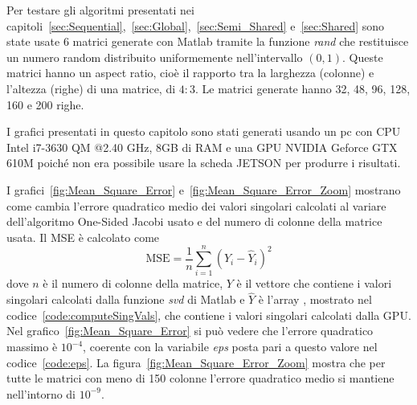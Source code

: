\label{sec:Performance}
Per testare gli algoritmi presentati nei capitoli~\ref{sec:Sequential},~\ref{sec:Global},~\ref{sec:Semi_Shared} e~\ref{sec:Shared} sono state usate 6 matrici generate con Matlab tramite la funzione \textit{rand} che restituisce un numero random distribuito uniformemente nell'intervallo $(0,1)$. Queste matrici hanno un aspect ratio, cioè il rapporto tra la larghezza (colonne) e l'altezza (righe) di una matrice, di $4:3$. Le matrici generate hanno 32, 48, 96, 128, 160 e 200 righe. 

I grafici presentati in questo capitolo sono stati generati usando un pc con CPU Intel i7-3630 QM @2.40 GHz, 8GB di RAM e una GPU NVIDIA Geforce GTX 610M poiché non era possibile usare la scheda JETSON per produrre i risultati.

I grafici~\ref{fig:Mean_Square_Error} e~\ref{fig:Mean_Square_Error_Zoom} mostrano come cambia l'errore quadratico medio dei valori singolari calcolati al variare dell'algoritmo One-Sided Jacobi usato e del numero di colonne della matrice usata. Il MSE è calcolato come 
$$ \text{MSE} = \dfrac{1}{n} \sum_{i = 1}^{n} (Y_i - \hat{Y}_i)^2$$
dove $n$ è il numero di colonne della matrice, $Y$ è il vettore che contiene i valori singolari calcolati dalla funzione \textit{svd} di Matlab e $\hat{Y}$ è l'array , mostrato nel codice~\ref{code:computeSingVals}, che contiene i valori singolari calcolati dalla GPU. Nel grafico~\ref{fig:Mean_Square_Error} si può vedere che l'errore quadratico massimo è $10^{-4}$, coerente con la variabile \textit{eps} posta pari a questo valore nel codice~\ref{code:eps}. La figura~\ref{fig:Mean_Square_Error_Zoom} mostra che per tutte le matrici con meno di 150 colonne l'errore quadratico medio si mantiene nell'intorno di $10^{-9}$.
